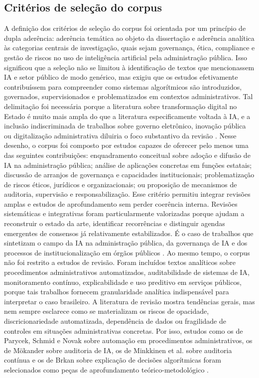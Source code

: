 \documentclass[12pt,a4paper]{article}
\begin{document}
\subsection{Critérios de seleção do corpus}
\label{sec:org171c69e}
A definição dos critérios de seleção do corpus foi orientada por um princípio de dupla aderência: aderência temática ao objeto da dissertação e aderência analítica às categorias centrais de investigação, quais sejam governança, ética, compliance e gestão de riscos no uso de inteligência artificial pela administração pública. Isso significou que a seleção não se limitou à identificação de textos que mencionassem IA e setor público de modo genérico, mas exigiu que os estudos efetivamente contribuíssem para compreender como sistemas algorítmicos são introduzidos, governados, supervisionados e problematizados em contextos administrativos. Tal delimitação foi necessária porque a literatura sobre transformação digital no Estado é muito mais ampla do que a literatura especificamente voltada à IA, e a inclusão indiscriminada de trabalhos sobre governo eletrônico, inovação pública ou digitalização administrativa diluiria o foco substantivo da revisão \autocite{madan2022ai} \autocite{david2023understanding}.
Nesse desenho, o corpus foi composto por estudos capazes de oferecer pelo menos uma das seguintes contribuições: enquadramento conceitual sobre adoção e difusão de IA na administração pública; análise de aplicações concretas em funções estatais; discussão de arranjos de governança e capacidades institucionais; problematização de riscos éticos, jurídicos e organizacionais; ou proposição de mecanismos de auditoria, supervisão e responsabilização. Esse critério permitiu integrar revisões amplas e estudos de aprofundamento sem perder coerência interna. Revisões sistemáticas e integrativas foram particularmente valorizadas porque ajudam a reconstruir o estado da arte, identificar recorrências e distinguir agendas emergentes de consensos já relativamente estabilizados. É o caso de trabalhos que sintetizam o campo da IA na administração pública, da governança de IA e dos processos de institucionalização em órgãos públicos \autocite{serra2024a} \autocite{madan2022ai} \autocite{batool2025ai} \autocite{goulart2025processos}.
Ao mesmo tempo, o corpus não foi restrito a estudos de revisão. Foram incluídos textos analíticos sobre procedimentos administrativos automatizados, auditabilidade de sistemas de IA, monitoramento contínuo, explicabilidade e uso preditivo em serviços públicos, porque tais trabalhos fornecem granularidade analítica indispensável para interpretar o caso brasileiro. A literatura de revisão mostra tendências gerais, mas nem sempre esclarece como se materializam os riscos de opacidade, discricionariedade automatizada, dependência de dados ou fragilidade de controles em situações administrativas concretas. Por isso, estudos como os de Parycek, Schmid e Novak sobre automação em procedimentos administrativos, os de Mökander sobre auditoria de IA, os de Minkkinen et al. sobre auditoria contínua e os de Brkan sobre explicação de decisões algorítmicas foram selecionados como peças de aprofundamento teórico-metodológico \autocite{parycek2023artificial} \autocite{mkander2023auditing} \autocite{minkkinen2022continuous} \autocite{brkan2020legal}.
\end{document}
